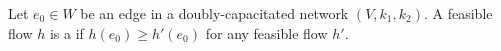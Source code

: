 Let $e_0 \in W$ be an edge in a doubly-capacitated network $(V, k_1, k_2)$. A feasible flow $h$ is a  if $h(e_0) \geq h'(e_0)$ for any feasible flow $h'$.
